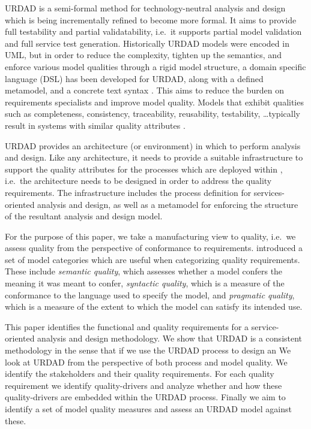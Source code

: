 URDAD is a semi-formal method for technology-neutral analysis and design \cite{solms_urdad_2010} which is being incrementally refined to become more formal. It aims to provide full testability and partial validatability, i.e.\ it supports partial model validation and full service test generation. Historically URDAD models were encoded in UML, but in order to reduce the complexity, tighten up the semantics, and enforce various model qualities through a rigid model structure, a domain specific language (DSL) has been developed for URDAD, along with a defined metamodel, and a concrete text syntax \cite{solmsfritz_domain-specific_????}. This aims to reduce the burden on requirements specialists and improve model quality. Models that exhibit qualities such as completeness, consistency, traceability, reusability, testability, \dots typically result in systems with similar quality attributes \cite{findItIfYouCan}.

URDAD provides an architecture (or environment) in which to perform analysis and design. Like any architecture, it needs to provide a suitable infrastructure to support the quality attributes for the processes which are deployed within \cite{}, i.e.\ the architecture needs to be designed in order to address the quality requirements. The infrastructure includes the process definition for services-oriented analysis and design, as well as a metamodel for enforcing the structure of the resultant analysis and design model.

For the purpose of this paper, we take a manufacturing view \cite{garvin_what_1984} to quality, i.e.\ we assess quality from the perspective of conformance to requirements. \cite{lindland_understanding_1994} introduced a set of model categories which are useful when categorizing quality requirements. These include \emph{semantic quality}, which assesses whether a model confers the meaning it was meant to confer, \emph{syntactic quality}, which is a measure of the conformance to the language used to specify the model, and \emph{pragmatic quality}, which is a measure of the extent to which the model can satisfy its intended use.

This paper identifies the functional and quality requirements for a service-oriented analysis and design methodology. We show that URDAD is a consistent methodology in the sense that if we use the URDAD process to design an 
We look at URDAD from the perspective of both process and model quality. We identify the stakeholders and their quality requirements. For each quality requirement we identify quality-drivers and analyze whether and how these quality-drivers are embedded within the URDAD process. Finally we aim to identify a set of model quality measures and assess an URDAD model against these.
